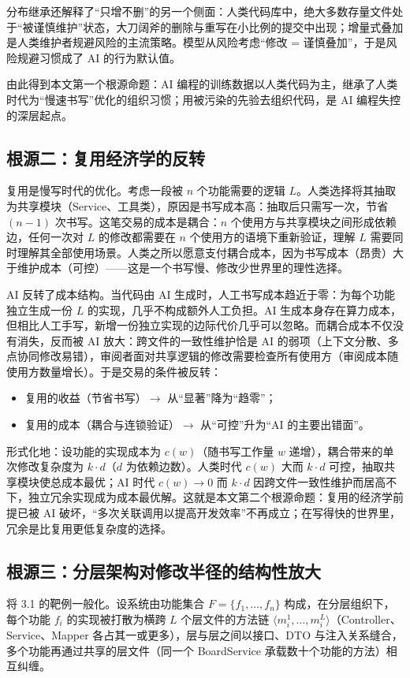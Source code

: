 \documentclass[11pt,a4paper]{ctexart}
\begin{document}
分布继承还解释了“只增不删”的另一个侧面：人类代码库中，绝大多数存量文件处于“被谨慎维护”状态，大刀阔斧的删除与重写在小比例的提交中出现；增量式叠加是人类维护者规避风险的主流策略。模型从风险考虑“修改 = 谨慎叠加”，于是风险规避习惯成了 AI 的行为默认值。

由此得到本文第一个根源命题：AI 编程的训练数据以人类代码为主，继承了人类时代为“慢速书写”优化的组织习惯；用被污染的先验去组织代码，是 AI 编程失控的深层起点。

\subsection{根源二：复用经济学的反转}
复用是慢写时代的优化。考虑一段被 $n$ 个功能需要的逻辑 $L$。人类选择将其抽取为共享模块（Service、工具类），原因是书写成本高：抽取后只需写一次，节省 $(n-1)$ 次书写。这笔交易的成本是耦合：$n$ 个使用方与共享模块之间形成依赖边，任何一次对 $L$ 的修改都需要在 $n$ 个使用方的语境下重新验证，理解 $L$ 需要同时理解其全部使用场景。人类之所以愿意支付耦合成本，因为书写成本（昂贵）大于维护成本（可控）——这是一个书写慢、修改少世界里的理性选择。

AI 反转了成本结构。当代码由 AI 生成时，人工书写成本趋近于零：为每个功能独立生成一份 $L$ 的实现，几乎不构成额外人工负担。AI 生成本身存在算力成本，但相比人工手写，新增一份独立实现的边际代价几乎可以忽略。而耦合成本不仅没有消失，反而被 AI 放大：跨文件的一致性维护恰是 AI 的弱项（上下文分散、多点协同修改易错），审阅者面对共享逻辑的修改需要检查所有使用方（审阅成本随使用方数量增长）。于是交易的条件被反转：

\begin{itemize}
\item 复用的收益（节省书写）$\rightarrow$ 从“显著”降为“趋零”；
\item 复用的成本（耦合与连锁验证）$\rightarrow$ 从“可控”升为“AI 的主要出错面”。
\end{itemize}

形式化地：设功能的实现成本为 $c(w)$（随书写工作量 $w$ 递增），耦合带来的单次修改复杂度为 $k\cdot d$（$d$ 为依赖边数）。人类时代 $c(w)$ 大而 $k\cdot d$ 可控，抽取共享模块使总成本最优；AI 时代 $c(w)\to 0$ 而 $k\cdot d$ 因跨文件一致性维护而居高不下，独立冗余实现成为成本最优解。这就是本文第二个根源命题：复用的经济学前提已被 AI 破坏，“多次关联调用以提高开发效率”不再成立；在写得快的世界里，冗余是比复用更低复杂度的选择。

\subsection{根源三：分层架构对修改半径的结构性放大}
将 3.1 的靶例一般化。设系统由功能集合 $F=\{f_1,\ldots,f_n\}$ 构成，在分层组织下，每个功能 $f_i$ 的实现被打散为横跨 $L$ 个层文件的方法链 $\langle m_i^1,\ldots,m_i^L\rangle$（Controller、Service、Mapper 各占其一或更多），层与层之间以接口、DTO 与注入关系缝合，多个功能再通过共享的层文件（同一个 BoardService 承载数十个功能的方法）相互纠缠。
\end{document}
